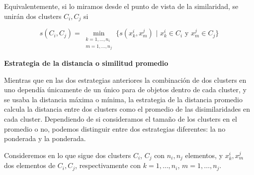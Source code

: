 Equivalentemente, si lo miramos desde el punto de vista de la similaridad, se unirán dos clusters $C_{i}, C_{j}$ si

\[
s(C_{i},C_{j}) = \min_{\substack{k=1,\dots,n_{i} \\ m=1,\dots,n_{j}}}\{s(x^{i}_{k},x^{j}_{m}) \text{ | } x^{i}_{k} \in C_{i} \text{ y } x^{j}_{m} \in C_{j}\}
\]

\textbf{Estrategia de la distancia o similitud promedio}

Mientras que en las dos estrategias anteriores la combinación de dos clusters en uno dependía únicamente de un único para de objetos dentro de cada cluster, 
y se usaba la distancia máxima o mínima, la estrategia de la distancia promedio calcula la distancia entre dos clusters como el promedio de las disimilaridades 
en cada cluster. Dependiendo de si consideramos el tamaño de los clusters en el promedio o no, podemos distinguir entre dos estrategias diferentes: la no ponderada
y la ponderada. \newline

Consideremos en lo que sigue dos clusters $C_{i}$, $C_{j}$ con $n_{i},n_{j}$ elementos, y $x^{i}_{k},x^{j}_{m}$ dos elementos de $C_{i},C_{j}$, respectivamente con $k=1,\dots,n_{i}$, $m=1,\dots,n_{j}$.

